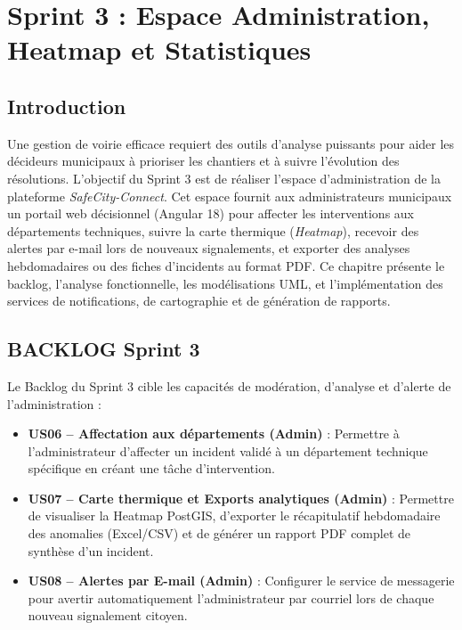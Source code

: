 
\chapter[Sprint 3 : Administration et Heatmap]{Sprint 3 : Espace Administration, Heatmap et Statistiques}

\section*{Introduction}
Une gestion de voirie efficace requiert des outils d'analyse puissants pour aider les décideurs municipaux à prioriser les chantiers et à suivre l'évolution des résolutions. L'objectif du Sprint 3 est de réaliser l'espace d'administration de la plateforme \textit{SafeCity-Connect}. Cet espace fournit aux administrateurs municipaux un portail web décisionnel (Angular 18) pour affecter les interventions aux départements techniques, suivre la carte thermique (\textit{Heatmap}), recevoir des alertes par e-mail lors de nouveaux signalements, et exporter des analyses hebdomadaires ou des fiches d'incidents au format PDF. Ce chapitre présente le backlog, l'analyse fonctionnelle, les modélisations UML, et l'implémentation des services de notifications, de cartographie et de génération de rapports.

\section{BACKLOG Sprint 3}
Le Backlog du Sprint 3 cible les capacités de modération, d'analyse et d'alerte de l'administration :
\begin{itemize}
    \item \textbf{US06 -- Affectation aux départements (Admin)} : Permettre à l'administrateur d'affecter un incident validé à un département technique spécifique en créant une tâche d'intervention.
    \item \textbf{US07 -- Carte thermique et Exports analytiques (Admin)} : Permettre de visualiser la Heatmap PostGIS, d'exporter le récapitulatif hebdomadaire des anomalies (Excel/CSV) et de générer un rapport PDF complet de synthèse d'un incident.
    \item \textbf{US08 -- Alertes par E-mail (Admin)} : Configurer le service de messagerie pour avertir automatiquement l'administrateur par courriel lors de chaque nouveau signalement citoyen.
\end{itemize}

